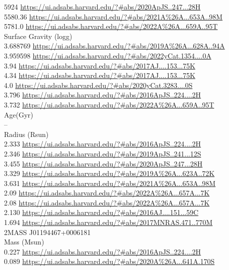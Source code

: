 5924 \url{https://ui.adsabs.harvard.edu/?#abs/2020ApJS..247...28H}\\
5580.36	 \url{https://ui.adsabs.harvard.edu/?#abs/2021A%26A...653A..98M}\\
5781.0 \url{https://ui.adsabs.harvard.edu/?#abs/2022A%26A...659A..95T}\\
Surface Gravity (logg)\\
3.688769 \url{https://ui.adsabs.harvard.edu/?#abs/2019A%26A...628A..94A}\\
3.959598 \url{https://ui.adsabs.harvard.edu/?#abs/2022yCat.1354....0A}\\
3.94 \url{https://ui.adsabs.harvard.edu/?#abs/2017AJ....153...75K}\\
4.34 \url{https://ui.adsabs.harvard.edu/?#abs/2017AJ....153...75K}\\
4.0 \url{https://ui.adsabs.harvard.edu/?#abs/2020yCat.3283....0S}\\
3.796 \url{https://ui.adsabs.harvard.edu/?#abs/2016ApJS..224....2H}\\
3.732 \url{https://ui.adsabs.harvard.edu/?#abs/2022A%26A...659A..95T}\\
Age(Gyr)\\
--\\
Radius (Rsun)\\
2.333 \url{https://ui.adsabs.harvard.edu/?#abs/2016ApJS..224....2H}\\
2.346 \url{https://ui.adsabs.harvard.edu/?#abs/2019ApJS..241...12S}\\
3.455 \url{https://ui.adsabs.harvard.edu/?#abs/2020ApJS..247...28H}\\
3.329 \url{https://ui.adsabs.harvard.edu/?#abs/2019A%26A...623A..72K}\\
3.631 \url{https://ui.adsabs.harvard.edu/?#abs/2021A%26A...653A..98M}\\
2.09 \url{https://ui.adsabs.harvard.edu/?#abs/2022A%26A...657A...7K}\\
2.08 \url{https://ui.adsabs.harvard.edu/?#abs/2022A%26A...657A...7K}\\
2.130 \url{https://ui.adsabs.harvard.edu/?#abs/2016AJ....151...59C}\\
1.694 \url{https://ui.adsabs.harvard.edu/?#abs/2017MNRAS.471..770M}\\
2MASS J01194467+0006181\\
Mass (Msun)\\
0.227 \url{https://ui.adsabs.harvard.edu/?#abs/2016ApJS..224....2H}\\
0.089 \url{https://ui.adsabs.harvard.edu/?#abs/2020A%26A...641A.170S}\\
